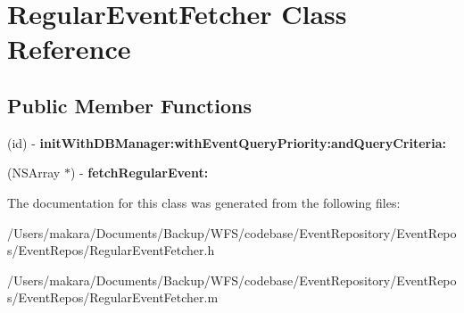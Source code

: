 \hypertarget{interface_regular_event_fetcher}{
\section{\-Regular\-Event\-Fetcher \-Class \-Reference}
\label{interface_regular_event_fetcher}
}
\subsection*{\-Public \-Member \-Functions}
\begin{DoxyCompactItemize}
\item 
\hypertarget{interface_regular_event_fetcher_ab9a8b04ff199f531c290f87b3652449e}{
(id) -\/ {\bfseries init\-With\-D\-B\-Manager\-:with\-Event\-Query\-Priority\-:and\-Query\-Criteria\-:}}
\label{interface_regular_event_fetcher_ab9a8b04ff199f531c290f87b3652449e}

\item 
\hypertarget{interface_regular_event_fetcher_a20044a6f1979778f307ac2d7cdca2864}{
(\-N\-S\-Array $\ast$) -\/ {\bfseries fetch\-Regular\-Event\-:}}
\label{interface_regular_event_fetcher_a20044a6f1979778f307ac2d7cdca2864}

\end{DoxyCompactItemize}


\-The documentation for this class was generated from the following files\-:\begin{DoxyCompactItemize}
\item 
/\-Users/makara/\-Documents/\-Backup/\-W\-F\-S/codebase/\-Event\-Repository/\-Event\-Repos/\-Event\-Repos/\-Regular\-Event\-Fetcher.\-h\item 
/\-Users/makara/\-Documents/\-Backup/\-W\-F\-S/codebase/\-Event\-Repository/\-Event\-Repos/\-Event\-Repos/\-Regular\-Event\-Fetcher.\-m\end{DoxyCompactItemize}
